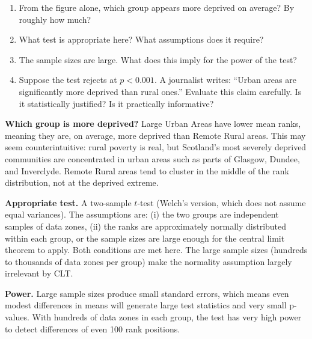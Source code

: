 \documentclass[
  letterpaper,
  11pt,
  twoside,
  openany]{scrbook}
\providecommand{\tightlist}{%
  \setlength{\itemsep}{0pt}\setlength{\parskip}{0pt}}
\begin{document}
\begin{enumerate}
\def\labelenumi{\arabic{enumi}.}
\tightlist
\item
  From the figure alone, which group appears more deprived on average?
  By roughly how much?
\item
  What test is appropriate here? What assumptions does it require?
\item
  The sample sizes are large. What does this imply for the power of the
  test?
\item
  Suppose the test rejects at \(p < 0.001\). A journalist writes:
  ``Urban areas are significantly more deprived than rural ones.''
  Evaluate this claim carefully. Is it statistically justified? Is it
  practically informative?
\end{enumerate}

\begin{tcolorbox}[enhanced jigsaw, arc=.35mm, bottomrule=.15mm, bottomtitle=1mm, breakable, colback=white, colbacktitle=quarto-callout-note-color!10!white, colframe=quarto-callout-note-color-frame, coltitle=black, left=2mm, leftrule=.75mm, opacityback=0, opacitybacktitle=0.6, rightrule=.15mm, title=\textcolor{quarto-callout-note-color}{\faInfo}\hspace{0.5em}{Solution to Problem 9}, titlerule=0mm, toprule=.15mm, toptitle=1mm]

\textbf{Which group is more deprived?} Large Urban Areas have lower mean
ranks, meaning they are, on average, more deprived than Remote Rural
areas. This may seem counterintuitive: rural poverty is real, but
Scotland's most severely deprived communities are concentrated in urban
areas such as parts of Glasgow, Dundee, and Inverclyde. Remote Rural
areas tend to cluster in the middle of the rank distribution, not at the
deprived extreme.

\textbf{Appropriate test.} A two-sample \(t\)-test (Welch's version,
which does not assume equal variances). The assumptions are: (i) the two
groups are independent samples of data zones, (ii) the ranks are
approximately normally distributed within each group, or the sample
sizes are large enough for the central limit theorem to apply. Both
conditions are met here. The large sample sizes (hundreds to thousands
of data zones per group) make the normality assumption largely
irrelevant by CLT.

\textbf{Power.} Large sample sizes produce small standard errors, which
means even modest differences in means will generate large test
statistics and very small p-values. With hundreds of data zones in each
group, the test has very high power to detect differences of even 100
rank positions.


\end{tcolorbox}
\end{document}

